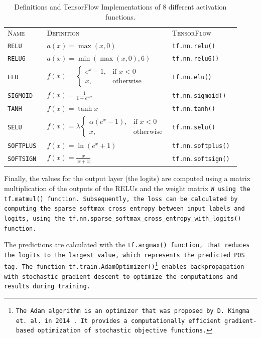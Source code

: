 \begin{table}[!ht]
	\centering\small{}\begin{tabular}{ p{23mm} p{62mm} l }
	\trule
	\textsc{Name} & \textsc{Definition} & \textsc{TensorFlow} \\
	\srule
	\tt{RELU} & $a(x)=\max(x,0)$ & \tt{tf.nn.relu()} \\
	\midrule
	\tt{RELU6} & $a(x)=\min(\max(x,0),6)$ & \tt{tf.nn.relu6()} \\
	\midrule
	\tt{ELU} & $f(x)=\begin{cases}e^x-1,& \text{if } x<0\\x, & \text{otherwise}\end{cases}$ & \tt{tf.nn.elu()} \\
	\midrule
	\tt{SIGMOID} & $f(x)=\frac{1}{1+e^{-x}} $ & \tt{tf.nn.sigmoid()} \\
	\midrule
	\tt{TANH} & $f(x)=\tanh{x} $ & \tt{tf.nn.tanh()} \\
	\midrule
	\tt{SELU} & $f(x)=\lambda\begin{cases}\alpha (e^x-1),& \text{if } x<0\\x, & \text{otherwise}\end{cases} $ & \tt{tf.nn.selu()} \\
	\midrule
	\tt{SOFTPLUS} & $f(x)=\ln{(e^x+1)} $ & \tt{tf.nn.softplus()} \\
	\midrule
	\tt{SOFTSIGN} & $f(x)=\frac{x}{|x+1|} $ & \tt{tf.nn.softsign()} \\
	\bottomrule
	\end{tabular}
	\vspace{1em}
	\caption[Activation Functions]{Definitions and TensorFlow Implementations of 8 different activation functions.}
	\label{t.postagging.activation}
\end{table}

Finally, the values for the output layer (the logits) are computed using a matrix multiplication of the outputs of the RELUs and the weight matrix \tt{W} using the \tt{tf.matmul()} function. Subsequently, the loss can be calculated by computing the sparse softmax cross entropy between input labels and logits, using the \tt{tf.nn.sparse\_softmax\_cross\_entropy\_with\_logits()} function.

The predictions are calculated with the \tt{tf.argmax()} function, that reduces the logits to the largest value, which represents the predicted POS tag. The function \tt{tf.train.AdamOptimizer()}\footnote{The Adam algorithm is an optimizer that was proposed by D. Kingma et. al. in 2014 \cite{kingma2014}. It provides a computationally efficient gradient-based optimization of stochastic objective functions.} enables backpropagation with stochastic gradient descent to optimize the computations and results during training.

